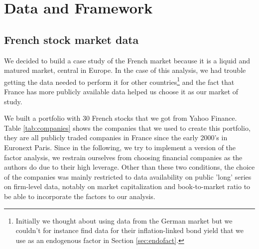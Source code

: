 \documentclass[hidelinks,11pts]{article}
\DeclareMathOperator{\1}{\mathbbm{1}}
\begin{document}
\begin{comment}
\emph{factors} of aggregate risk is compensated by $k$ 
of the risk premium by identifying the compensation of $k$ different 


Unlike the CAPM model that considers a unique risk premium, the factorial model considers that investors holding risk in their portfolios\footnote{We assume that said portfolios are sufficiently large so that any source of idiosyncratic risk can be diversified so that only aggregate risk is remunerated.} by holding a stock $j$, are compensated with $k$ different risk premia associated to $k$ common factors.%

\end{comment}





\section{Data and Framework} 

    \subsection{French stock market data} \label{sec:model}
We decided to build a case study of the French market because it is a liquid and matured market, central in Europe. 
In the case of this analysis, we had trouble getting the data needed to perform it for other countries\footnote{Initially we thought about using data from the German market but we couldn't for instance find data for their inflation-linked bond yield that we use as an endogenous factor in Section \ref{sec:endofact}.} and the fact that France has more publicly available data helped us choose it as our market of study. 

We built a portfolio with 30 French stocks that we got from Yahoo Finance. Table \ref{tab:companies} shows the companies that we used to create this portfolio, they are all publicly traded companies in France since the early 2000's in Euronext Paris. 
Since in the following, we try to implement a version of the  \cite{famaCrossSectionExpectedStock1992} factor analysis, we restrain ourselves from choosing financial companies as the authors do due to their high leverage. 
Other than these two conditions, the choice of the companies was mainly restricted to data availability on public 'long' series on firm-level data, notably on market capitalization and book-to-market ratio to be able to incorporate the \cite{famaCrossSectionExpectedStock1992} factors to our analysis. 
\end{document}
